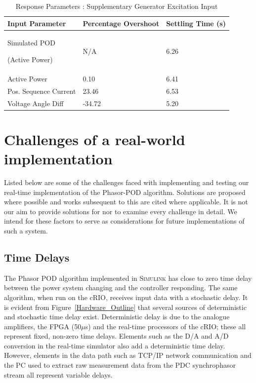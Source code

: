 \documentclass{ieeeaccess}
\begin{document}
\begin{table}[htp]
\caption{Response Parameters : Supplementary Generator Excitation Input}\label{GENResponseTable}
\begin{center}
\begin{tabular}{|p{80pt}|p{60pt}|p{60pt}|}
\hline \textbf{Input Parameter} & \textbf{Percentage Overshoot} & \textbf{Settling Time (s)} \\
\hline Simulated POD \par (Active Power) & N/A & 6.26\\ 
\hline Active Power & 0.10 & 6.41\\ 
\hline Pos. Sequence Current & 23.46 & 6.53 \\ 
\hline Voltage Angle Diff & -34.72 & 5.20 \\ 
\hline 
\end{tabular}
\end{center}
\end{table}

\section{Challenges of a real-world implementation}\label{Challenges}
Listed below are some of the challenges faced with implementing and testing our real-time implementation of the Phasor-POD algorithm. Solutions are proposed where possible and works subsequent to this are cited where applicable. It is not our aim to provide solutions for nor to examine every challenge in detail. We intend for these factors to serve as considerations for future implementations of such a system.

\subsection{Time Delays}

The Phasor POD algorithm implemented in \textsc{Simulink} has close to zero time delay between the power system changing and the controller responding. The same algorithm, when run on the cRIO, receives input data with a stochastic delay. It is evident from Figure~\ref{Hardware_Outline} that several sources of deterministic and stochastic time delay exist. Deterministic delay is due to the analogue amplifiers, the FPGA (50$\mu$s) and the real-time processors of the cRIO; these all represent fixed, non-zero time delays. Elements such as the D/A and A/D conversion in the real-time simulator also add a deterministic time delay. However, elements in the data path such as TCP/IP network communication and the PC used to extract raw measurement data from the PDC synchrophasor stream all represent variable delays. 
\end{document}
